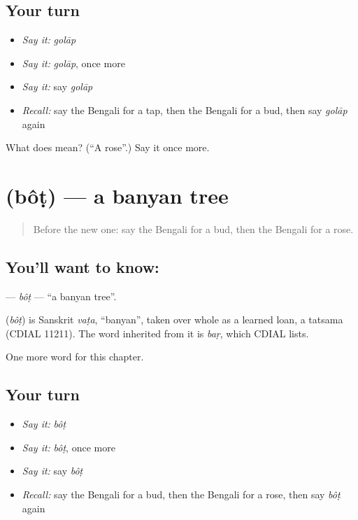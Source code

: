 \subsection*{Your turn}
\begin{itemize}
\raggedright
  \item \emph{Say it:} \emph{golāp}
  \item \emph{Say it:} \emph{golāp}, once more
  \item \emph{Say it:} say \emph{golāp}
  \item \emph{Recall:} say the Bengali for a tap, then the Bengali for a bud, then say \emph{golāp} again
\end{itemize}

\begin{tcolorbox}[breakable,colback=teal!4,colframe=teal!35!black,title={Before you move on}]
What does  mean? (\textquotedblleft{}A rose\textquotedblright{}.) Say it once more.
\end{tcolorbox}
\section[\texorpdfstring{\bn{বট} (bôṭ)}{বট (bôṭ)}]{ (bôṭ) — a banyan tree}

\label{lesson:BN-C171-bot}



\begin{quote}
Before the new one: say the Bengali for a bud, then the Bengali for a rose.
\end{quote}

\subsection*{You'll want to know: }
\textbf{} — \emph{bôṭ} — \textquotedblleft{}a banyan tree\textquotedblright{}.

\begin{cousinweb}
\textbf{} (\emph{bôṭ}) is Sanskrit \emph{vaṭa}, \textquotedblleft{}banyan\textquotedblright{}, taken over whole as a learned loan, a tatsama (CDIAL 11211). The word inherited from it is \emph{baṛ}, which CDIAL lists.
\end{cousinweb}

\begin{grammarlens}[title={What you've built}]
One more word for this chapter.
\end{grammarlens}

\subsection*{Your turn}
\begin{itemize}
\raggedright
  \item \emph{Say it:} \emph{bôṭ}
  \item \emph{Say it:} \emph{bôṭ}, once more
  \item \emph{Say it:} say \emph{bôṭ}
  \item \emph{Recall:} say the Bengali for a bud, then the Bengali for a rose, then say \emph{bôṭ} again
\end{itemize}

